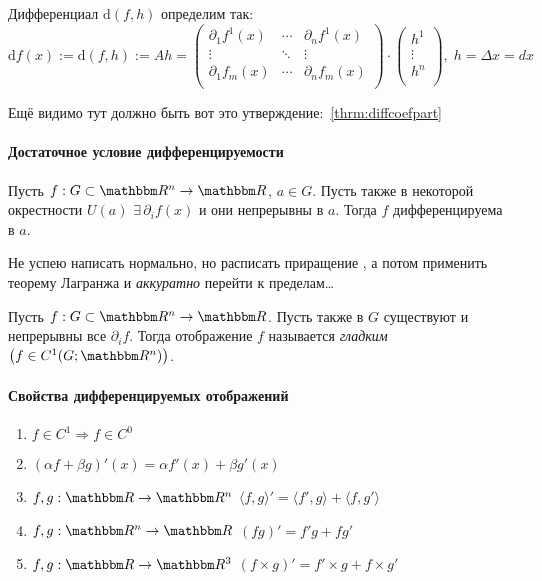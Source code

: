 \documentclass[12pt]{../../notes}
\begin{document}
\begin{defn}\label{defn:differentialRn}
  Дифференциал $\mathrm{d}(f,h)$ определим так:
  \[
    \mathrm{d}f(x) := \mathrm{d}(f,h):= A h = 
    \begin{pmatrix}
      \partial_1 f^1(x) & \cdots & \partial_n f^1(x) \\
      \vdots         & \ddots & \vdots \\
      \partial_1 f_m(x) & \cdots & \partial_n f_m(x) \\
    \end{pmatrix}\cdot
    \begin{pmatrix}
      h^1 \\
      \vdots \\
      h^n \\
    \end{pmatrix}, \; h = \Delta x = dx
  \]
\end{defn}

Ещё видимо тут должно быть вот это утверждение:~\ref{thrm:diffcoefpart}
\paragraph{Достаточное условие дифференцируемости}

\begin{thrm}\label{thrm:nessdiffRn}
  Пусть $f:G \subset \R^n \to \R$, $a \in G$. Пусть также в некоторой окрестности $U(a)$ $\exists\, \partial_i f(x)$
  и они непрерывны в $a$. Тогда $f$ дифференцируема в $a$.
\end{thrm}
\begin{ittproof}
  Не успею написать нормально, но расписать приращение , а потом применить теорему Лагранжа и \emph{аккуратно} перейти к пределам\ldots
\end{ittproof}

\begin{defn}\label{defn:smoothRn}
  Пусть $f:G\subset \R^n \to \R$. Пусть также в $G$ существуют и непрерывны все $\partial_i f$.
  Тогда отображение $f$ называется \emph{гладким} \\ $\big(f\in C^1(G;\R^n)\big)$.
\end{defn}

\paragraph{Свойства дифференцируемых отображений}
\begin{enumerate}
  \item $f \in C^1 \Rightarrow f \in C^0$
  \item $(\alpha f + \beta g)'(x) = \alpha f'(x) + \beta g'(x)$
  \item $f, g: \R \to \R^n$ $\langle f,g\rangle' = \langle f',g\rangle + \langle f,g'\rangle $
  \item $f, g: \R^n \to \R$  $(fg)' = f'g + fg'$
  \item $f, g: \R \to \R^3$  $(f \times g)' = f' \times g + f \times g'$
\end{enumerate}
\end{document}
